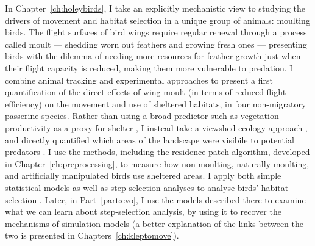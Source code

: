 In Chapter~\ref{ch:holeybirds}, I take an explicitly mechanistic view to studying the drivers of movement and habitat selection in a unique group of animals: moulting birds.
The flight surfaces of bird wings require regular renewal through a process called moult --- shedding worn out feathers and growing fresh ones --- presenting birds with the dilemma of needing more resources for feather growth just when their flight capacity is reduced, making them more vulnerable to predation.
I combine animal tracking and experimental approaches to present a first quantification of the direct effects of wing moult (in terms of reduced flight efficiency) on the movement and use of sheltered habitats, in four non-migratory passerine species.
Rather than using a broad predictor such as vegetation productivity as a proxy for shelter \parencite{pettorelli2011}, I instead take a viewshed ecology approach \parencite{aben2018}, and directly quantified which areas of the landscape were visibile to potential predators \parencite[the `fearscape'][]{olsoy2015}.
I use the methods, including the residence patch algorithm, developed in Chapter~\ref{ch:preprocessing}, to measure how non-moulting, naturally moulting, and artificially manipulated birds use sheltered areas.
I apply both simple statistical models as well as step-selection analyses to analyse birds' habitat selection \parencite{fortin2005,avgar2016}.
Later, in Part~\ref{part:evo}, I use the models described there to examine what we can learn about step-selection analysis, by using it to recover the mechanisms of simulation models (a better explanation of the links between the two is presented in Chapters~\ref{ch:kleptomove}).

